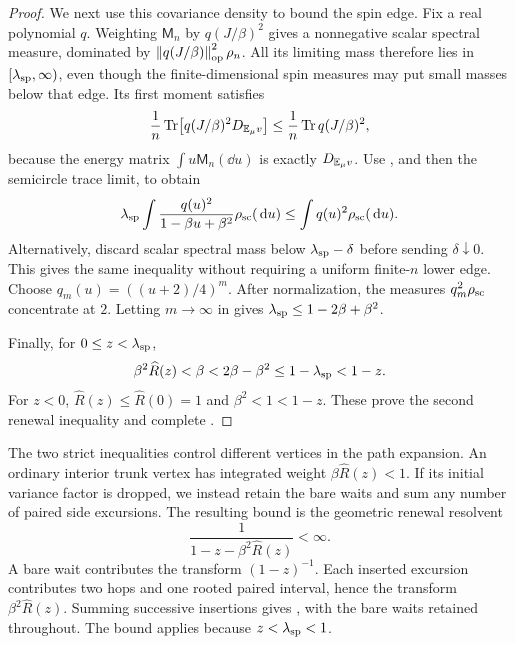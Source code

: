 \begin{proof}
We next use this covariance density to bound the spin edge.  Fix a real
polynomial $q$.  Weighting $\mathsf M_n$ by $q(J/\beta)^2$ gives a
nonnegative scalar spectral measure, dominated by
$\left\lVert q(J/\beta)\right\rVert_{\mathrm{op}}^2\rho_n$.  All its limiting mass therefore
lies in $[\lambda_{\rm sp},\infty)$, even though the finite-dimensional
spin measures may put small masses below that edge.  Its first moment
satisfies
\[
 \frac1n\operatorname{Tr}\bigl[q(J/\beta)^2D_{\mathbb E_\mu v}\bigr]
       \le\frac1n\operatorname{Tr} q(J/\beta)^2,
\]
because the energy matrix
$\int u\mathsf M_n(\dd u)$ is exactly $D_{\mathbb E_\mu v}$.
Use , and then the semicircle trace
limit, to obtain
\begin{equation}
 \lambda_{\rm sp}
   \int\frac{q(u)^2}{1-\beta u+\beta^2}\rho_{\rm sc}(\,\mathrm d u)
       \le\int q(u)^2\rho_{\rm sc}(\,\mathrm d u).
 \label{eq:spin-edge-test}
\end{equation}
Alternatively, discard scalar spectral mass below
$\lambda_{\rm sp}-\delta$ before sending $\delta\downarrow0$.  This
gives the same inequality without requiring a uniform finite-$n$ lower
edge.
Choose $q_m(u)=((u+2)/4)^m$.  After normalization, the measures
$q_m^2\rho_{\rm sc}$ concentrate at $2$.  Letting $m\to\infty$ in
 gives
$\lambda_{\rm sp}\le1-2\beta+\beta^2$.

Finally, for $0\le z<\lambda_{\rm sp}$,
\[
 \beta^2\widehat R(z)<\beta
       <2\beta-\beta^2
       \le1-\lambda_{\rm sp}<1-z.
\]
For $z<0$, $\widehat R(z)\le\widehat R(0)=1$ and
$\beta^2<1<1-z$.  These prove the second renewal inequality and
complete .
\end{proof}

The two strict inequalities control different vertices in the path
expansion.  An ordinary interior trunk vertex has integrated weight
$\beta\widehat R(z)<1$.  If its initial variance factor is dropped,
we instead retain the bare waits and sum any number of paired side
excursions.  The resulting bound is the geometric renewal resolvent
\begin{equation}
 \frac1{1-z-\beta^2\widehat R(z)}<\infty.
 \label{eq:spin-exceptional-renewal}
\end{equation}
A bare wait contributes the transform $(1-z)^{-1}$.  Each inserted
excursion contributes two hops and one rooted paired interval, hence
the transform $\beta^2\widehat R(z)$.  Summing successive insertions
gives , with the bare waits retained
throughout.  The bound applies because $z<\lambda_{\rm sp}<1$.
